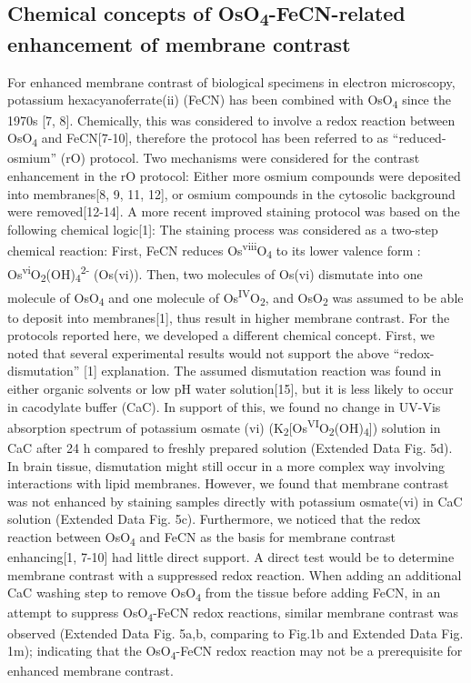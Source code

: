 \documentclass{article}
\begin{document}
\subsection*{Chemical concepts of OsO\textsubscript{4}-FeCN-related enhancement of membrane contrast}


For enhanced membrane contrast of biological specimens in electron microscopy, potassium hexacyanoferrate(ii) (FeCN) has been combined with OsO\textsubscript{4} since the 1970s [7, 8]. Chemically, this was considered to involve a redox reaction between OsO\textsubscript{4 }and FeCN[7-10], therefore the protocol has been referred to as “reduced-osmium” (rO) protocol. Two mechanisms were considered for the contrast enhancement in the rO protocol: Either more osmium compounds were deposited into membranes[8, 9, 11, 12], or osmium compounds in the cytosolic background were removed[12-14]. A more recent improved staining protocol was based on the following chemical logic[1]: The staining process was considered as a two-step chemical reaction: First, FeCN reduces Os\textsuperscript{viii}O\textsubscript{4} to its lower valence form : Os\textsuperscript{vi}O\textsubscript{2}(OH)\textsubscript{4}\textsuperscript{2-} (Os(vi)). Then, two molecules of Os(vi) dismutate into one molecule of OsO\textsubscript{4 }and one molecule of Os\textsuperscript{IV}O\textsubscript{2}, and OsO\textsubscript{2} was assumed to be able to deposit into membranes[1], thus result in higher membrane contrast. For the protocols reported here, we developed a different chemical concept. First, we noted that several experimental results would not support the above “redox-dismutation” [1] explanation. The assumed dismutation reaction was found in either organic solvents or low pH water solution[15], but it is less likely to occur in cacodylate buffer (CaC). In support of this, we found no change in UV-Vis absorption spectrum of potassium osmate (vi) (K\textsubscript{2}[Os\textsuperscript{VI}O\textsubscript{2}(OH)\textsubscript{4}]) solution in CaC after 24 h compared to freshly prepared solution (Extended Data Fig. 5d). In brain tissue, dismutation might still occur in a more complex way involving interactions with lipid membranes. However, we found that membrane contrast was not enhanced by staining samples directly with potassium osmate(vi) in CaC solution (Extended Data Fig. 5c). Furthermore, we noticed that the redox reaction between OsO\textsubscript{4} and FeCN as the basis for membrane contrast enhancing[1, 7-10] had little direct support. A direct test would be to determine membrane contrast with a suppressed redox reaction. When adding an additional CaC washing step to remove OsO\textsubscript{4} from the tissue before adding FeCN, in an attempt to suppress OsO\textsubscript{4}-FeCN redox reactions, similar membrane contrast was observed (Extended Data Fig. 5a,b, comparing to Fig.1b and Extended Data Fig. 1m); indicating that the OsO\textsubscript{4}-FeCN redox reaction may not be a prerequisite for enhanced membrane contrast.  
\end{document}
